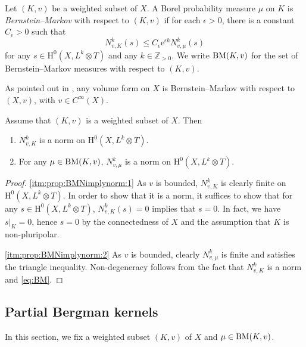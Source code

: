 \begin{definition}\label{def:BMmeasure}
Let $(K,v)$ be a weighted subset of $X$.
A Borel probability measure $\mu$ on $K$ is \emph{Bernstein--Markov} with respect to $(K,v)$ if for each $\epsilon>0$, there is a constant $C_\epsilon>0$ such that
\begin{equation}\label{eq:BM}
     N^k_{v,K}(s) \leq C_\epsilon \mathrm{e}^{\epsilon k} N^k_{v,\mu}(s)
\end{equation}
for any $s \in \mathrm{H}^0(X,L^k \otimes T)$ and any $k\in \mathbb{Z}_{>0}$.
We write $\mathrm{BM}(K,v)$ for the set of Bernstein--Markov measures with respect to $(K,v)$.
\end{definition}
As pointed out in \cite{BBWN11}, any volume form on $X$ is Bernstein--Markov with respect to $(X,v)$, with $v \in C^\infty(X)$.


\begin{proposition}\label{prop:BMNimplynorm}
Assume that $(K,v)$ is a weighted subset of $X$. Then
\begin{enumerate}
    \item\label{itm:prop:BMNimplynorm:1} $N^k_{v,K}$ is a norm on $\mathrm{H}^0(X,L^k\otimes T)$.
    \item\label{itm:prop:BMNimplynorm:2} For any $\mu\in \mathrm{BM}(K,v)$, $N^k_{v,\mu}$ is a norm on $\mathrm{H}^0(X,L^k\otimes T)$.
\end{enumerate}
\end{proposition}
\begin{proof}
\ref{itm:prop:BMNimplynorm:1}
As $v$ is bounded, $N^k_{v,K}$ is clearly finite on $\mathrm{H}^0(X,L^k\otimes T)$. In order to show that it is a norm, it suffices to show that for any $s\in \mathrm{H}^0(X,L^k\otimes T)$, $N^k_{v,K}(s)=0$ implies that $s=0$. In fact, we have $s|_K=0$, hence $s=0$ by the connectedness of $X$ and the assumption that $K$ is non-pluripolar.

\ref{itm:prop:BMNimplynorm:2}
As $v$ is bounded, clearly $N^k_{v,\mu}$ is finite and satisfies the triangle inequality. Non-degeneracy follows from the fact that $N^k_{v,K}$ is a norm and \eqref{eq:BM}.
\end{proof}



\subsection{Partial Bergman kernels}
\label{subsec:pBerg}
In this section, we fix a weighted subset $(K,v)$ of $X$ and $\mu\in \mathrm{BM}(K,v)$.

